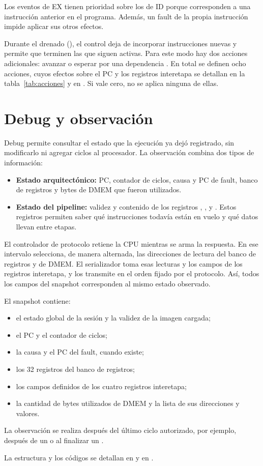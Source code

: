 Los eventos de EX tienen prioridad sobre los de ID porque corresponden a una
instrucción anterior en el programa. Además, un fault de la propia instrucción
impide aplicar sus otros efectos.

Durante el drenado (), el control deja de incorporar
instrucciones nuevas y permite que terminen las que siguen activas. Para este
modo hay dos acciones adicionales: avanzar o esperar por una dependencia
. En total se definen ocho acciones, cuyos efectos sobre el PC
y los registros interetapa se detallan en la tabla~\ref{tab:acciones} y en
. Si
 vale cero, no se aplica ninguna de ellas.

\section{Debug y observación}

Debug permite consultar el estado que la ejecución ya dejó registrado, sin
modificarlo ni agregar ciclos al procesador. La observación combina dos tipos
de información:

\begin{itemize}
  \item \textbf{Estado arquitectónico:} PC, contador de ciclos, causa y PC de
  fault, banco de registros y bytes de DMEM que fueron utilizados.
  \item \textbf{Estado del pipeline:} validez y contenido de los registros
  , ,  y . Estos registros
  permiten saber qué instrucciones todavía están en vuelo y qué datos llevan
  entre etapas.
\end{itemize}

El controlador de protocolo retiene la CPU mientras se arma la respuesta. En
ese intervalo selecciona, de manera alternada, las direcciones de lectura del
banco de registros y de DMEM. El serializador toma esas lecturas y los campos
de los registros interetapa, y los transmite en el orden fijado por el
protocolo. Así, todos los campos del snapshot corresponden al mismo estado
observado.

El snapshot contiene:

\begin{itemize}
  \item el estado global de la sesión y la validez de la imagen cargada;
  \item el PC y el contador de ciclos;
  \item la causa y el PC del fault, cuando existe;
  \item los 32 registros del banco de registros;
  \item los campos definidos de los cuatro registros interetapa;
  \item la cantidad de bytes utilizados de DMEM y la lista de sus direcciones
  y valores.
\end{itemize}

La observación se realiza después del último ciclo autorizado, por ejemplo,
después de un  o al finalizar un .

La estructura y los códigos se detallan en  y en
.
